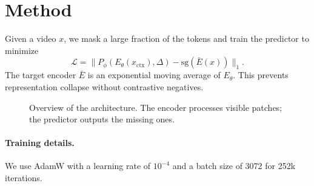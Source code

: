 \section{Method}
\label{sec:method}
Given a video $x$, we mask a large fraction of the tokens and train the predictor to minimize
\begin{equation}
  \mathcal{L} = \lVert P_\phi(E_\theta(x_{\text{ctx}}), \Delta) - \text{sg}(\bar{E}(x)) \rVert_1 . \label{eq:loss}
\end{equation}
The target encoder $\bar{E}$ is an exponential moving average of $E_\theta$.
This prevents representation collapse without contrastive negatives.

\begin{figure}[h]
  \centering
  \fbox{\rule{0pt}{2cm}\rule{4cm}{0pt}}
  \caption{Overview of the architecture. The encoder processes visible patches; the predictor outputs the missing ones.}
  \label{fig:arch}
\end{figure}

\paragraph{Training details.} We use AdamW with a learning rate of $10^{-4}$ and a batch size of 3072 for 252k iterations.
